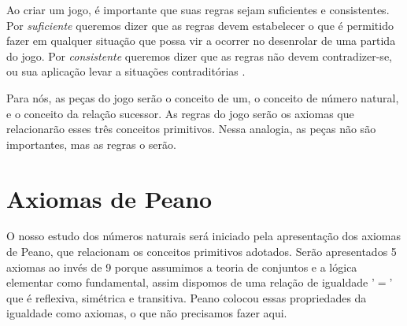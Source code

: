 \documentclass[../main.tex]{subfiles}
\begin{document}
\begin{displayquote} Ao criar um jogo, é importante que suas regras sejam suficientes e consistentes. Por \emph{suficiente} queremos dizer que as regras devem estabelecer o que é permitido fazer em qualquer situação que possa vir a ocorrer no desenrolar de uma partida do jogo. Por \emph{consistente} queremos dizer que as regras não devem contradizer-se, ou sua aplicação levar a situações contraditórias \Parencite[p. 13-14]{barbosa}.
\end{displayquote}

Para nós, as peças do jogo serão o conceito de um, o conceito de número natural, e o conceito da relação sucessor. As regras do jogo serão os axiomas que relacionarão esses três conceitos primitivos. Nessa analogia, as peças não são importantes, mas as regras o serão.

\section{Axiomas de Peano}
O nosso estudo dos números naturais será iniciado pela apresentação dos axiomas de Peano, que relacionam os conceitos primitivos adotados. Serão apresentados 5 axiomas ao invés de 9 porque assumimos a teoria de conjuntos e a lógica elementar como fundamental, assim dispomos de uma relação de igualdade '$=$' que é reflexiva, simétrica e transitiva. Peano colocou essas propriedades da igualdade como axiomas, o que não precisamos fazer aqui. 
\end{document}
